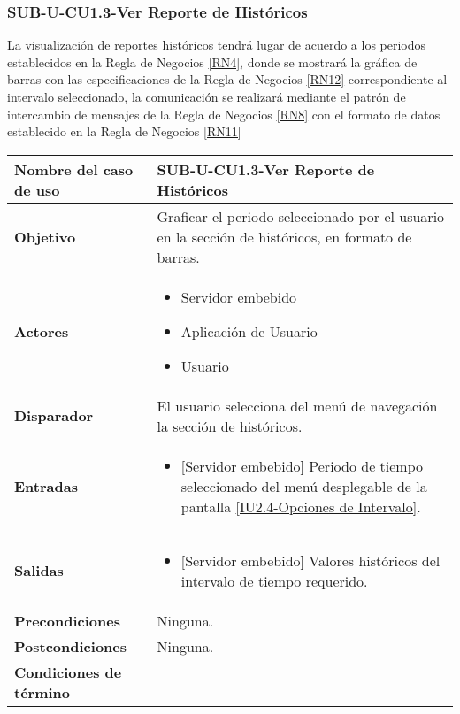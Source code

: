 \subsubsection{SUB-U-CU1.3-Ver Reporte de Históricos}\label{SUB-U-CU1.3}
La visualización de reportes históricos tendrá lugar de acuerdo a los periodos establecidos en la Regla de Negocios \ref{RN4}, donde se mostrará la gráfica de barras con las especificaciones de la Regla de Negocios \ref{RN12} correspondiente al intervalo seleccionado, la comunicación se realizará mediante el patrón de intercambio de mensajes de la Regla de Negocios \ref{RN8} con el formato de datos establecido en la Regla de Negocios \ref{RN11}

\begin{longtable}{|J{5cm}|J{10.3cm}|}
	\hline
	\textbf{Nombre del caso de uso} &
		SUB-U-CU1.3-Ver Reporte de Históricos \\ \hline
	\textbf{Objetivo} &
		Graficar el periodo seleccionado por el usuario en la sección de históricos, en formato de barras. \\ \hline
	\textbf{Actores} &
		\begin{itemize}
			\item Servidor embebido
			\item Aplicación de Usuario
			\item Usuario 
		\end{itemize} \\ \hline
	\textbf{Disparador} & 
		El usuario selecciona del menú de navegación la sección de históricos. \\ \hline 
	\textbf{Entradas} & 
		\begin{itemize}
			\item{[Servidor embebido]} Periodo de tiempo seleccionado del menú desplegable de la pantalla \hyperref[fig:Opciones de Intervalo]{[IU2.4-Opciones de Intervalo]}.
		\end{itemize}\\ \hline 
	\textbf{Salidas} & 
		\begin{itemize}
			\item{[Servidor embebido]} Valores históricos del intervalo de tiempo requerido.
		\end{itemize} \\ \hline
	\textbf{Precondiciones} &
		Ninguna.\\ \hline
	\textbf{Postcondiciones} &
		Ninguna.\\ \hline
	\textbf{Condiciones de término} & 
		\begin{itemize}

\end{itemize}
\end{longtable}
